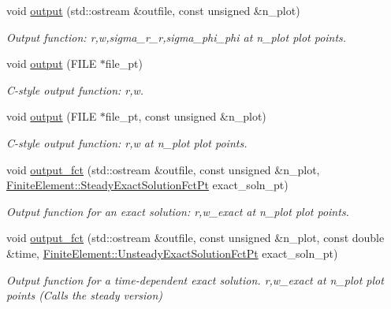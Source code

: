 \begin{DoxyCompactItemize}
void \hyperlink{classoomph_1_1AxisymFoepplvonKarmanElement_a435aab946dfcaa0b23e7df59e9bc3933}{output} (std\+::ostream \&outfile, const unsigned \&n\+\_\+plot)
\begin{DoxyCompactList}\small\item\em Output function\+: r,w,sigma\+\_\+r\+\_\+r,sigma\+\_\+phi\+\_\+phi at n\+\_\+plot plot points. \end{DoxyCompactList}\item 
void \hyperlink{classoomph_1_1AxisymFoepplvonKarmanElement_a17a94d66cf74c7be11d8e0a514db1d92}{output} (F\+I\+LE $\ast$file\+\_\+pt)
\begin{DoxyCompactList}\small\item\em C-\/style output function\+: r,w. \end{DoxyCompactList}\item 
void \hyperlink{classoomph_1_1AxisymFoepplvonKarmanElement_a09a7d0ec1c8c495c7703e6c034d8eafc}{output} (F\+I\+LE $\ast$file\+\_\+pt, const unsigned \&n\+\_\+plot)
\begin{DoxyCompactList}\small\item\em C-\/style output function\+: r,w at n\+\_\+plot plot points. \end{DoxyCompactList}\item 
void \hyperlink{classoomph_1_1AxisymFoepplvonKarmanElement_aee745c3439aa18c82ddbe8b90fade1c0}{output\+\_\+fct} (std\+::ostream \&outfile, const unsigned \&n\+\_\+plot, \hyperlink{classoomph_1_1FiniteElement_a690fd33af26cc3e84f39bba6d5a85202}{Finite\+Element\+::\+Steady\+Exact\+Solution\+Fct\+Pt} exact\+\_\+soln\+\_\+pt)
\begin{DoxyCompactList}\small\item\em Output function for an exact solution\+: r,w\+\_\+exact at n\+\_\+plot plot points. \end{DoxyCompactList}\item 
void \hyperlink{classoomph_1_1AxisymFoepplvonKarmanElement_a290c4391d1da3688805466cf2852a93e}{output\+\_\+fct} (std\+::ostream \&outfile, const unsigned \&n\+\_\+plot, const double \&time, \hyperlink{classoomph_1_1FiniteElement_ad4ecf2b61b158a4b4d351a60d23c633e}{Finite\+Element\+::\+Unsteady\+Exact\+Solution\+Fct\+Pt} exact\+\_\+soln\+\_\+pt)
\begin{DoxyCompactList}\small\item\em Output function for a time-\/dependent exact solution. r,w\+\_\+exact at n\+\_\+plot plot points (Calls the steady version) \end{DoxyCompactList}\item 

\end{DoxyCompactItemize}

